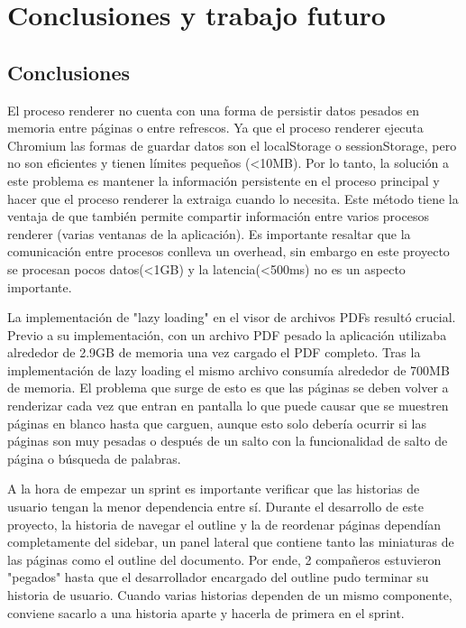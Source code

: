 \chapter{Conclusiones y trabajo futuro}
\section{Conclusiones}


El proceso renderer no cuenta con una forma de persistir datos pesados en memoria entre páginas o entre refrescos. Ya que el proceso renderer ejecuta Chromium las formas de guardar datos son el localStorage o sessionStorage, pero no son eficientes y tienen límites pequeños (<10MB). Por lo tanto, la solución a este problema es mantener la información persistente en el proceso principal y hacer que el proceso renderer la extraiga cuando lo necesita. Este método tiene la ventaja de que también permite compartir información entre varios procesos renderer (varias ventanas de la aplicación). Es importante resaltar que la comunicación entre procesos conlleva un overhead, sin embargo en este proyecto se procesan pocos datos(<1GB) y la latencia(<500ms) no es un aspecto importante.


La implementación de "lazy loading" en el visor de archivos PDFs resultó crucial. Previo a su implementación, con un archivo PDF pesado la aplicación utilizaba alrededor de 2.9GB de memoria una vez cargado el PDF completo. Tras la implementación de lazy loading el mismo archivo consumía alrededor de 700MB de memoria. El problema que surge de esto es que las páginas se deben volver a renderizar cada vez que entran en pantalla lo que puede causar que se muestren páginas en blanco hasta que carguen, aunque esto solo debería ocurrir si las páginas son muy pesadas o después de un salto con la funcionalidad de salto de página o búsqueda de palabras.


A la hora de empezar un sprint es importante verificar que las historias de usuario tengan la menor dependencia entre sí. Durante el desarrollo de este proyecto, la historia de navegar el outline y la de reordenar páginas dependían completamente del sidebar, un panel lateral que contiene tanto las miniaturas de las páginas como el outline del documento. Por ende, 2 compañeros estuvieron "pegados" hasta que el desarrollador encargado del outline pudo terminar su historia de usuario. Cuando varias historias dependen de un mismo componente, conviene sacarlo a una historia aparte y hacerla de primera en el sprint.


